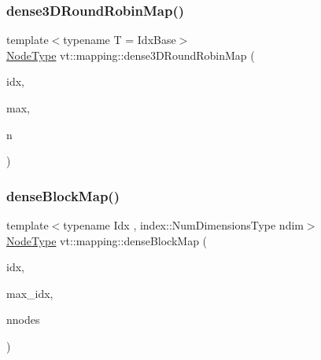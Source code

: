 \mbox{\label{namespacevt_1_1mapping_aa48fa3b830b637787c584dbac5bba6db}} 
\subsubsection{\texorpdfstring{dense3\+D\+Round\+Robin\+Map()}{dense3DRoundRobinMap()}}
{\footnotesize\ttfamily template$<$typename T  = Idx\+Base$>$ \\
\hyperlink{namespacevt_a866da9d0efc19c0a1ce79e9e492f47e2}{Node\+Type} vt\+::mapping\+::dense3\+D\+Round\+Robin\+Map (\begin{DoxyParamCaption}\item[{\hyperlink{namespacevt_1_1mapping_aacc737158b6517f2d760ffc8d1b5abca}{Idx3\+D\+Ptr}$<$ T $>$}]{idx,  }\item[{\hyperlink{namespacevt_1_1mapping_aacc737158b6517f2d760ffc8d1b5abca}{Idx3\+D\+Ptr}$<$ T $>$}]{max,  }\item[{\hyperlink{namespacevt_a866da9d0efc19c0a1ce79e9e492f47e2}{Node\+Type}}]{n }\end{DoxyParamCaption})}

\mbox{\label{namespacevt_1_1mapping_a290c8ece78ae8ffc8aa79dbb43a743d6}} 
\subsubsection{\texorpdfstring{dense\+Block\+Map()}{denseBlockMap()}}
{\footnotesize\ttfamily template$<$typename Idx , index\+::\+Num\+Dimensions\+Type ndim$>$ \\
\hyperlink{namespacevt_a866da9d0efc19c0a1ce79e9e492f47e2}{Node\+Type} vt\+::mapping\+::dense\+Block\+Map (\begin{DoxyParamCaption}\item[{\hyperlink{namespacevt_1_1mapping_a1bcab0d331bff853fe09c964d5e9cc8c}{Idx\+Ptr}$<$ Idx $>$}]{idx,  }\item[{\hyperlink{namespacevt_1_1mapping_a1bcab0d331bff853fe09c964d5e9cc8c}{Idx\+Ptr}$<$ Idx $>$}]{max\+\_\+idx,  }\item[{\hyperlink{namespacevt_a866da9d0efc19c0a1ce79e9e492f47e2}{Node\+Type}}]{nnodes }\end{DoxyParamCaption})}

